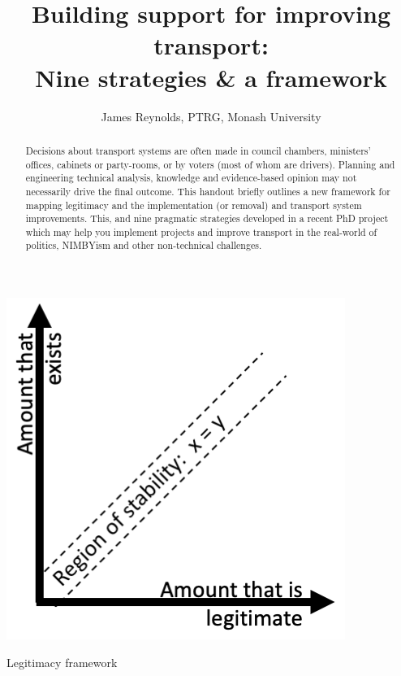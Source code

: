 \documentclass{tufte-handout}
\title{Building support for improving transport: \\ Nine strategies \& a framework}
\author{James Reynolds, PTRG, Monash University}
\begin{document}
\maketitle%

\begin{abstract}
\noindent
Decisions about transport systems are often made in council chambers, ministers' offices, cabinets or party-rooms, or by voters (most of whom are drivers). Planning and engineering technical analysis, knowledge and evidence-based opinion may not necessarily drive the final outcome. This handout briefly outlines a new framework for mapping legitimacy and the  implementation (or removal) and transport system improvements. This, and nine pragmatic strategies developed in a recent PhD project\cite{Reynolds:2020aa} which may help you implement projects and improve transport in the real-world of politics, NIMBYism and other non-technical challenges.
\end{abstract}



\begin{marginfigure}%
  \includegraphics[width=\linewidth]{Figure1}
  \caption{Legitimacy framework}
  \label{fig:FIgure1}
\end{marginfigure}
\end{document}
